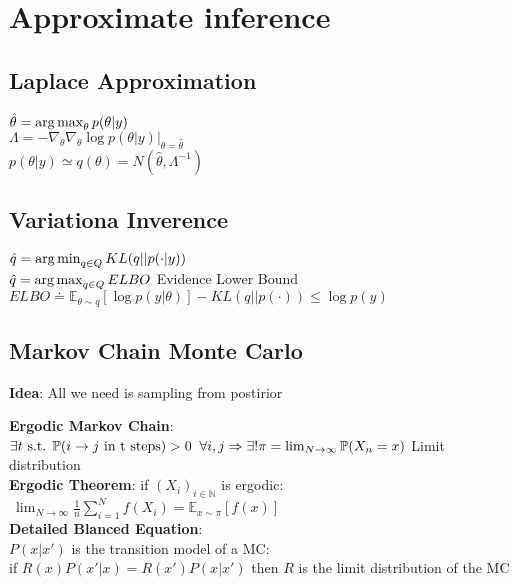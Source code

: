 
\section{Approximate inference}


\subsection{Laplace Approximation}
$\hat\theta=\operatorname*{arg\,max}_\theta p(\theta\vert y)$\\
$\Lambda = -\nabla_\theta \nabla_\theta \log{p(\theta\vert y)}\vert_{\theta = \hat\theta}$\\
$p(\theta\vert y)\simeq q(\theta)=N(\hat\theta,\Lambda^{-1})$


\subsection{Variationa Inverence}
$\hat q = \operatorname*{arg\,min}_{q \in Q} KL(q\vert\vert p(\cdot\vert y))$\\
$\hat q = \operatorname*{arg\,max}_{q \in Q} ELBO$ Evidence Lower Bound\\
$ELBO \doteq \mathbb{E}_{\theta \sim q}\left[\log{p(y\vert\theta)}\right]-KL(q\vert\vert p(\cdot)) \leq \log{p(y)}$


\subsection{Markov Chain Monte Carlo}
\textbf{Idea}: All we need is sampling from postirior

\textbf{Ergodic Markov Chain}: \\
$\exists t \text{ s.t. } \mathbb{P}(i \to j \text{ in t steps})>0\;\; \forall i,j \Rightarrow\\
 \exists! \pi = \lim_{N\to \infty} \mathbb{P}(X_n=x)$ Limit distribution\\

 \textbf{Ergodic Theorem}: if $(X_i)_{i\in\mathbb{N}}$ is ergodic:\\
$\ \lim_{N\to \infty}\frac{1}{n}\sum_{i=1}^{N}f(X_i)=\mathbb{E}_{x\sim\pi}\left[f(x)\right]$\\

\textbf{Detailed Blanced Equation}:\\
$P(x\vert x')$ is the transition model of a MC:\\
if $R(x)P(x'\vert x) = R(x')P(x\vert x')$ then $R$ is the limit distribution of the MC \\


